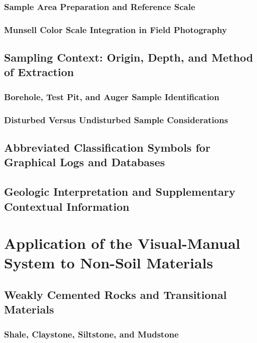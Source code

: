 \subsubsection{Sample Area Preparation and Reference Scale}

\subsubsection{Munsell Color Scale Integration in Field Photography}

\subsection{Sampling Context: Origin, Depth, and Method of Extraction}

\subsubsection{Borehole, Test Pit, and Auger Sample Identification}

\subsubsection{Disturbed Versus Undisturbed Sample Considerations}

\subsection{Abbreviated Classification Symbols for Graphical Logs and Databases}

\subsection{Geologic Interpretation and Supplementary Contextual Information}

\section{Application of the Visual-Manual System to Non-Soil Materials}

\subsection{Weakly Cemented Rocks and Transitional Materials}

\subsubsection{Shale, Claystone, Siltstone, and Mudstone}

